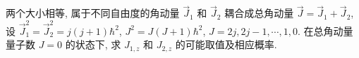 两个大小相等, 属于不同自由度的角动量 $\vec{J}_{1}$ 和 $\vec{J}_{2}$ 耦合成总角动量 $\vec{J} = \vec{J}_{1} + \vec{J}_{2}$, 设 $\vec{J}_{1}^{2} = \vec{J}_{2}^{2} = j(j+1)\hbar^{2}$, $J^{2} = J(J+1)\hbar^{2}$, $J = 2j, 2j-1, \cdots, 1, 0$. 在总角动量量子数 $J = 0$ 的状态下, 求 $J_{1,z}$ 和 $J_{2,z}$ 的可能取值及相应概率.